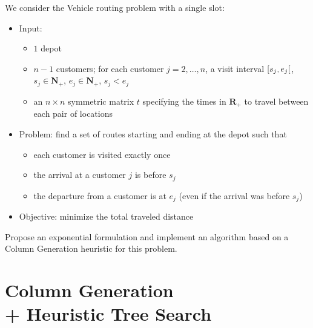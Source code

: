 \documentclass[a4paper,twocolumn]{article}
\newcommand{\N}{\mathbf{N}}
\newcommand{\R}{\mathbf{R}}
\begin{document}
We consider the Vehicle routing problem with a single slot:
\begin{itemize}
  \item Input:
    \begin{itemize}
      \item $1$ depot
      \item $n - 1$ customers; for each customer $j = 2, \dots, n$, a visit interval $\interval[open right]{s_j}{e_j}$, $s_j \in \N_+$, $e_j \in \N_+$, $s_j < e_j$
      \item an $n \times n$ symmetric matrix $t$ specifying the times in $\R_+$ to travel between each pair of locations
    \end{itemize}
  \item Problem: find a set of routes starting and ending at the depot such that
    \begin{itemize}
      \item each customer is visited exactly once
      \item the arrival at a customer $j$ is before $s_j$
      \item the departure from a customer is at $e_j$ (even if the arrival was before $s_j$)
    \end{itemize}
  \item Objective: minimize the total traveled distance
\end{itemize}

Propose an exponential formulation and implement an algorithm based on a Column Generation heuristic for this problem.

\section{Column Generation \\ + Heuristic Tree Search}
\end{document}
